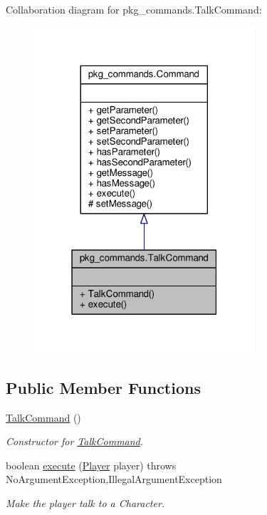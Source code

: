 Collaboration diagram for pkg\-\_\-commands.\-Talk\-Command\-:
\nopagebreak
\begin{figure}[H]
\begin{center}
\leavevmode
\includegraphics[width=232pt]{classpkg__commands_1_1TalkCommand__coll__graph}
\end{center}
\end{figure}
\subsection*{Public Member Functions}
\begin{DoxyCompactItemize}
\item 
\hyperlink{classpkg__commands_1_1TalkCommand_aafa1679affe7c5622c30806837e8fb90}{Talk\-Command} ()
\begin{DoxyCompactList}\small\item\em Constructor for \hyperlink{classpkg__commands_1_1TalkCommand}{Talk\-Command}. \end{DoxyCompactList}\item 
boolean \hyperlink{classpkg__commands_1_1TalkCommand_a413573388e24a2d442f9814695f7e47c}{execute} (\hyperlink{classpkg__world_1_1Player}{Player} player)  throws No\-Argument\-Exception,\-Illegal\-Argument\-Exception 
\begin{DoxyCompactList}\small\item\em Make the player talk to a Character. \end{DoxyCompactList}\end{DoxyCompactItemize}
